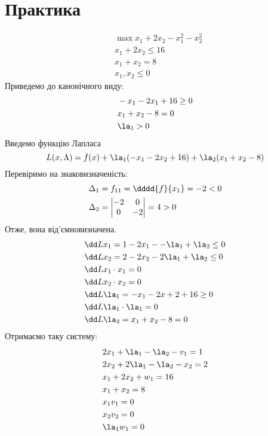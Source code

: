 \section{Практика} 
\begin{tsk}
\begin{eqnarray}
&\max x_1 +2x_2 -x_1^2-x_2^2\\
&x_1 + 2x_2 \leq 16\\
&x_1+x_2=8\\
&x_1,x_2\leq 0
\end{eqnarray}
Приведемо до канонічного виду:
\begin{eqnarray}
&-x_1 -2x_1 +16 \geq 0\\
&x_1+x_2-8=0\\
&\la_1>0
\end{eqnarray}
Введемо функцію Лапласа
\begin{equation}
L(x,\Lambda) = f(x) + \la_1(-x_1-2x_2+16) + \la_2(x_1+x_2-8)
\end{equation}
Перевіримо на знаковизначеність:
\begin{eqnarray}
&\Delta_1 = f_{11} = \dddd{f}{x_1} = -2 <0\\
&\Delta_2 = \begin{vmatrix}
-2 & 0 \\
0 & -2
\end{vmatrix} = 4 > 0
\end{eqnarray}
Отже, вона від’ємновизначена.
\begin{eqnarray}
&\dd L{x_1} = 1 - 2 x_1- - \la_1 + \la_2 \leq 0 \\
&\dd L{x_2} = 2 - 2x_2 -2\la_1 +\la_2 \leq 0\\
&\dd L{x_1}\cdot x_1 = 0\\
&\dd L{x_2} \cdot x_2 = 0\\
&\dd L{\la_1} = -x_1 - 2x+2 +16 \geq 0 \\
&\dd L{\la_1} \cdot \la_1 = 0 \\
&\dd L{\la_2} = x_1 +x_2 - 8 = 0
\end{eqnarray}
Отримаємо таку систему:
\begin{eqnarray}
&2x_1 +\la_1 - \la_2 -v_1 = 1\\
&2x_2 + 2\la_1 - \la_2 -x_2 = 2\\
&x_1 + 2x_2 +w_1 = 16\\
&x_1 + x_2 =8\\
&x_1v_1 =0\\
&x_2 v_2 =0 \\
&\la_1w_1 =0\\

\end{eqnarray}
\end{tsk}
